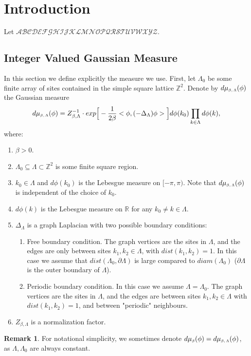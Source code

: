 \documentclass[11pt,reqno]{article}
\theoremstyle{definition}
\newtheorem*{remark}{Remark}
\numberwithin{equation}{section}
\begin{document}
\section{Introduction}\label{sec:introduction}
\newcommand*{\mida}{d\mu_{\text{\tiny$\beta$}}(\phi)}
\newcommand*{\midaLambda}{d\mu_{\text{\tiny$\beta, \Lambda$}}(\phi)}
\newcommand*{\midar}{d\mu_\beta(\phi)}
Let $\mathscr{ABCDEFGHIJKLMNOPQRSTUVWXYZ}$.

\subsection{Integer Valued Gaussian Measure}
In this section we define explicitly the measure we use.
First, let $\Lambda_0$ be some finite array of sites contained in the simple square lattice $\mathbb{Z}^2$. Denote by $\midaLambda$ the Gaussian measure
$$
\midaLambda = Z_{\beta, \Lambda}^{-1} \cdot exp\Big[-\frac{1}{2\beta}<\phi, (-\Delta_\Lambda)\phi>\Big]d\phi(k_0)\prod_{k \in \Lambda}d\phi(k),
$$
where:
\begin{enumerate}
\item $\beta > 0$.
\item $\Lambda_0 \subseteq \Lambda \subset \mathbb{Z}^2$ is some finite square region.
\item $k_0 \in \Lambda$ and $d\phi(k_0)$ is the Lebesgue measure on $[-\pi,\pi)$. Note that $\midaLambda$ is independent of the choice of $k_0$.
\item $d\phi(k)$ is the Lebesgue measure on $\mathbb{R}$ for any $k_0 \neq k \in \Lambda$.
\item $\Delta_\Lambda$ is a graph Laplacian with two possible boundary conditions:
\begin{enumerate}
\item Free boundary condition. The graph vertices are the sites in $\Lambda$, and the edges are only between sites $k_1, k_2 \in \Lambda$, with $dist(k_1, k_2) = 1$. In this case we assume that $dist(\Lambda_0, \partial\Lambda)$ is large compared to $diam(\Lambda_0)$ ($\partial\Lambda$ is the outer boundary of $\Lambda$). 
\item Periodic boundary condition. In this case we assume $\Lambda = \Lambda_0$. The graph vertices are the sites in $\Lambda$, and the edges are between sites $k_1, k_2 \in \Lambda$ with $dist(k_1, k_2) = 1$, and between "periodic" neighbours.
\end{enumerate}
\item $Z_{\beta, \Lambda}$ is a normalization factor.
\end{enumerate}
\begin{remark}
For notational simplicity, we sometimes denote $\mida = \midaLambda$, as $\Lambda, \Lambda_0$ are always constant.
\end{remark}
\end{document}
